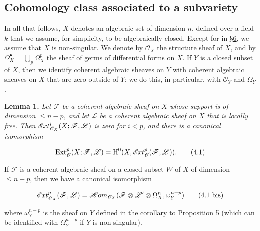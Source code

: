 \documentclass{article}
\newenvironment{itenv}[1]
  {\phantomsection\par\smallskip\noindent\textbf{#1.}\itshape}
  {\par\smallskip}
\newenvironment{eqenv}
  {}
  {}
\theoremstyle{definition}
\theoremstyle{definition}
\theoremstyle{definition}
\theoremstyle{definition}
\theoremstyle{remark}
\begin{document}
\hypertarget{fga-1-section-4}{%
\subsection{Cohomology class associated to a subvariety}\label{fga-1-section-4}}

In all that follows, \(X\) denotes an algebraic set of dimension \(n\), defined over a field \(k\) that we assume, for simplicity, to be algebraically closed.
Except for in \protect\hyperlink{fga-1-section-6}{§6}, we assume that \(X\) is non-singular.
We denote by \({\mathscr{O}}_X\) the structure sheaf of \(X\), and by \(\Omega_X^\bullet=\bigcup_p\Omega_X^p\) the sheaf of germs of differential forms on \(X\).
If \(Y\) is a closed subset of \(X\), then we identify coherent algebraic sheaves on \(Y\) with coherent algebraic sheaves on \(X\) that are zero outside of \(Y\);
we do this, in particular, with \({\mathscr{O}}_Y\) and \(\Omega_Y\).

\leavevmode{}%
\begin{itenv}{Lemma 1}
Let \({\mathscr{F}}\) be a coherent algebraic sheaf on \(X\) whose support is of dimension \(\leqslant n-p\), and let \({\mathscr{L}}\) be a coherent algebraic sheaf on \(X\) that is locally free.
Then \(\mathscr{E}\kern -.5pt xt_{{\mathscr{O}}_X}^i(X;{\mathscr{F}},{\mathscr{L}})\) is zero for \(i<p\), and there is a canonical isomorphism

\leavevmode{}%
\begin{eqenv}
\[
  \operatorname{Ext}_{\mathscr{O}}^p(X;{\mathscr{F}},{\mathscr{L}}) = \operatorname{H}^0(X,\mathscr{E}\kern -.5pt xt_{\mathscr{O}}^p({\mathscr{F}},{\mathscr{L}})).
\tag{4.1}
\]

\end{eqenv}

If \({\mathscr{F}}\) is a coherent algebraic sheaf on a closed subset \(W\) of \(X\) of dimension \(\leqslant n-p\), then we have a canonical isomorphism

\leavevmode{}%
\begin{eqenv}
\[
  \mathscr{E}\kern -.5pt xt_{{\mathscr{O}}_X}^p({\mathscr{F}},{\mathscr{L}}) = \mathscr{H}\kern -.5pt om_{{\mathscr{O}}_X}({\mathscr{F}}\otimes{\mathscr{L}}'\otimes\Omega_X^n,\omega_Y^{n-p})
\tag{4.1 bis}
\]

\end{eqenv}

where \(\omega_Y^{n-p}\) is the sheaf on \(Y\) defined in \protect\hyperlink{fga-1-proposition-5-corollary}{the corollary to Proposition 5} (which can be identified with \(\Omega_Y^{n-p}\) if \(Y\) is non-singular).

\end{itenv}
\end{document}
